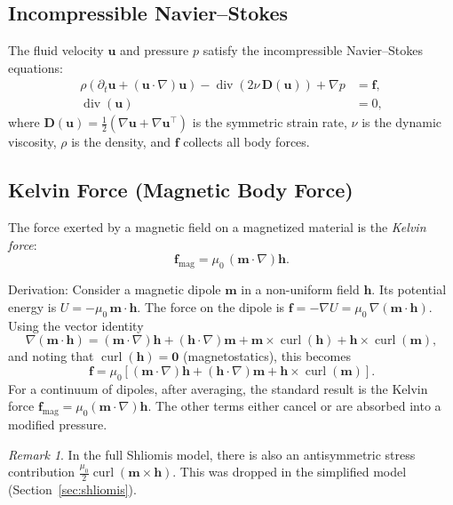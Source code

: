 \documentclass[11pt,a4paper]{article}
\theoremstyle{definition}
\theoremstyle{remark}
\newtheorem{remark}[proposition]{Remark}
\newcommand{\dt}{\partial_t}
\newcommand{\dv}{\operatorname{div}}
\newcommand{\curl}{\operatorname{curl}}
\newcommand{\grad}{\nabla}
\newcommand{\half}{\tfrac{1}{2}}
\newcommand{\bfu}{\bm{u}}
\newcommand{\bfm}{\bm{m}}
\newcommand{\bfh}{\bm{h}}
\newcommand{\bff}{\bm{f}}
\begin{document}
\subsection{Incompressible Navier--Stokes}

The fluid velocity $\bfu$ and pressure $p$ satisfy the incompressible
Navier--Stokes equations:
\begin{equation}
  \label{eq:NS-generic}
  \begin{aligned}
    \rho\left(\dt\bfu + (\bfu \cdot \grad)\bfu\right)
    - \dv\!\left(2\nu\,\bm{D}(\bfu)\right) + \grad p &= \bff, \\
    \dv(\bfu) &= 0,
  \end{aligned}
\end{equation}
where $\bm{D}(\bfu) = \half(\grad\bfu + \grad\bfu^\top)$ is the
symmetric strain rate, $\nu$ is the dynamic viscosity, $\rho$ is the
density, and $\bff$ collects all body forces.

\subsection{Kelvin Force (Magnetic Body Force)}
\label{sec:kelvin}

The force exerted by a magnetic field on a magnetized material is the
\emph{Kelvin force}:
\begin{equation}
  \label{eq:kelvin}
  \bff_{\mathrm{mag}} = \mu_0\,(\bfm \cdot \grad)\bfh.
\end{equation}

\begin{derivnote}
Derivation: Consider a magnetic dipole $\bfm$ in a non-uniform field
$\bfh$. Its potential energy is $U = -\mu_0\,\bfm \cdot \bfh$. The
force on the dipole is $\bff = -\grad U = \mu_0\,\grad(\bfm \cdot \bfh)$.
Using the vector identity
\[
  \grad(\bfm \cdot \bfh)
  = (\bfm \cdot \grad)\bfh + (\bfh \cdot \grad)\bfm
    + \bfm \times \curl(\bfh) + \bfh \times \curl(\bfm),
\]
and noting that $\curl(\bfh) = \bm{0}$ (magnetostatics), this becomes
\[
  \bff = \mu_0\left[(\bfm \cdot \grad)\bfh + (\bfh \cdot \grad)\bfm
         + \bfh \times \curl(\bfm)\right].
\]
For a continuum of dipoles, after averaging, the standard result is the
Kelvin force $\bff_{\mathrm{mag}} = \mu_0(\bfm \cdot \grad)\bfh$.
The other terms either cancel or are absorbed into a modified pressure.
\end{derivnote}

\begin{remark}
  In the full Shliomis model, there is also an antisymmetric stress
  contribution $\frac{\mu_0}{2}\curl(\bfm \times \bfh)$. This was
  dropped in the simplified model (Section~\ref{sec:shliomis}).
\end{remark}
\end{document}

